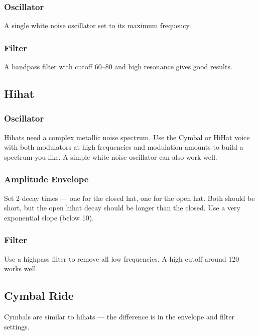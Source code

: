 \subsubsection{Oscillator}\label{oscillator-1}

A single white noise oscillator set to its maximum frequency.

\subsubsection{Filter}\label{filter}

A bandpass filter with cutoff 60--80 and high resonance gives good
results.

\subsection{Hihat}\label{hihat}

\subsubsection{Oscillator}\label{oscillator-2}

Hihats need a complex metallic noise spectrum. Use the Cymbal or HiHat
voice with both modulators at high frequencies and modulation amounts to
build a spectrum you like. A simple white noise oscillator can also work
well.

\subsubsection{Amplitude Envelope}\label{amplitude-envelope-3}

Set 2 decay times --- one for the closed hat, one for the open hat. Both
should be short, but the open hihat decay should be longer than the
closed. Use a very exponential slope (below 10).

\subsubsection{Filter}\label{filter-1}

Use a highpass filter to remove all low frequencies. A high cutoff
around 120 works well.

\subsection{Cymbal Ride}\label{cymbal-ride}

Cymbals are similar to hihats --- the difference is in the envelope and
filter settings.

